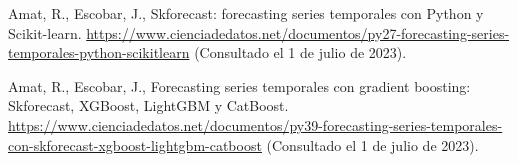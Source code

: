 \documentclass[12pt,twoside]{article}
\begin{document}
\begin{thebibliography}{100}
 Amat, R., Escobar, J., Skforecast: forecasting series temporales con Python y Scikit-learn. \href{https://www.cienciadedatos.net/documentos/py27-forecasting-series-temporales-python-scikitlearn}{https://www.cienciadedatos.net/documentos/py27-forecasting-series-temporales-python-scikitlearn} (Consultado el 1 de julio de 2023).

 Amat, R., Escobar, J., Forecasting series temporales con gradient boosting: Skforecast, XGBoost, LightGBM y CatBoost. \href{https://www.cienciadedatos.net/documentos/py39-forecasting-series-temporales-con-skforecast-xgboost-lightgbm-catboost}{https://www.cienciadedatos.net/documentos/py39-forecasting-series-temporales-con-skforecast-xgboost-lightgbm-catboost} (Consultado el 1 de julio de 2023).


 

















\end{thebibliography}
\end{document}
